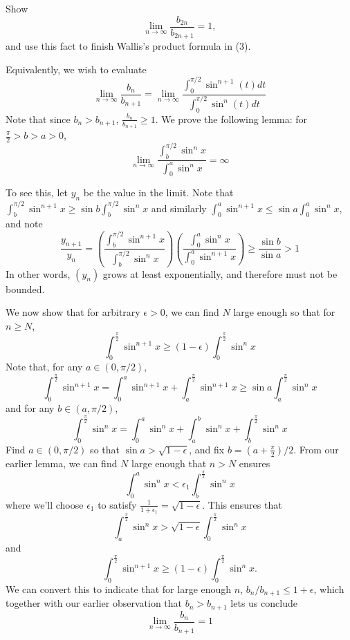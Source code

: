 \begin{exercise}
Show
\[\lim_{n \to \infty} \frac{b_{2n}}{b_{2n+1}} = 1,\]
and use this fact to finish Wallis's product formula in (3).
\end{exercise}
\begin{solution}
    Equivalently, we wish to evaluate
\[\lim_{n \to \infty} \frac{b_n}{b_{n+1}} = \lim_{n \to \infty} \frac{\int^{\pi/2}_0 \sin^{n+1} (t) dt}{\int^{\pi/2}_0 \sin^n (t) dt}\]
Note that since \(b_n > b_{n+1}\), \(\frac{b_n}{b_{n+1}} \geq 1\).
We prove the following lemma: for \(\frac{\pi}{2} > b > a > 0\),
\[\lim_{n \to \infty} \frac{\int^{\pi/2}_b \sin^n x}{\int^a_0 \sin^n x} = \infty\]

To see this, let \(y_n\) be the value in the limit. Note that \(\int^{\pi/2}_b \sin^{n+1}x \geq \sin b \int^{\pi/2}_b \sin^n x\) and similarly \(\int_0^a \sin^{n+1}x \leq \sin a \int_0^a \sin^n x\), and note
\[\frac{y_{n+1}}{y_n} = \left(\frac{\int^{\pi/2}_b \sin^{n+1} x}{\int^{\pi/2}_b \sin^{n} x}\right) \left(\frac{\int_0^a \sin^{n} x}{\int_0^a \sin^{n+1} x}\right) \geq \frac{\sin b}{\sin a}> 1\]
In other words, \((y_n)\) grows at least exponentially, and therefore must not be bounded.

We now show that for arbitrary \(\epsilon > 0\), we can find \(N\) large enough so that for \(n \geq N\),
\[\int^\frac{\pi}{2}_0 \sin^{n+1} x \geq (1-\epsilon) \int_0^\frac{\pi}{2} \sin^n x\]
Note that, for any \(a \in (0, \pi / 2)\),
\[\int^\frac{\pi}{2}_0 \sin^{n+1} x = \int_0^a \sin^{n+1} x + \int_a^\frac{\pi}{2} \sin^{n+1} x \geq \sin a \int_a^\frac{\pi}{2} \sin^n x\]
and for any \(b \in (a, \pi/2)\),
\[\int_0^\frac{\pi}{2} \sin^n x = \int_0^a \sin^n x + \int_a^b \sin^n x + \int_b^\frac{\pi}{2}\sin^n x\]
Find \(a \in (0, \pi/2)\) so that \(\sin a > \sqrt{1-\epsilon}\), and fix \(b = \left(a + \frac{\pi}{2}\right)/2\). From our earlier lemma, we can find \(N\) large enough that \(n > N\) ensures
\[\int_0^a \sin^n x < \epsilon_1 \int_b^\frac{\pi}{2}\sin^n x\]
where we'll choose \(\epsilon_1\) to satisfy \(\frac{1}{1 + \epsilon_1} = \sqrt{1 - \epsilon}\). This ensures that
\[\int^\frac{\pi}{2}_a \sin^n x > \sqrt{1-\epsilon} \int_0^\frac{\pi}{2} \sin^n x\]
and
\[\int^\frac{\pi}{2}_0 \sin^{n+1} x \geq (1-\epsilon) \int_0^\frac{\pi}{2} \sin^n x.\]
We can convert this to indicate that for large enough \(n\), \(b_n / b_{n+1} \leq 1 + \epsilon\), which together with our earlier observation that \(b_n > b_{n+1}\) lets us conclude
\[\lim_{n \to \infty} \frac{b_n}{b_{n+1}} = 1\]
\end{solution}
